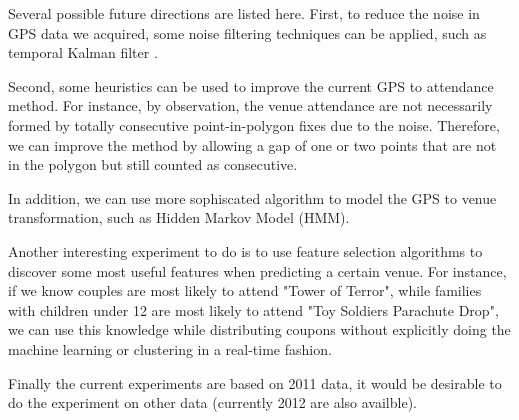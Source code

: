 \documentclass[12pt]{article}
\begin{document}
Several possible future directions are listed here. First, to reduce the noise in GPS data we acquired, some noise filtering techniques can be applied, such as temporal Kalman filter \cite{Welch95}.

Second, some heuristics can be used to improve the current GPS to attendance method. For instance, by observation, the venue attendance are not necessarily formed by totally consecutive point-in-polygon fixes due to the noise. Therefore, we can improve the method by allowing a gap of one or two points that are not in the polygon but still counted as consecutive.

In addition, we can use more sophiscated algorithm to model the GPS to venue transformation, such as Hidden Markov Model (HMM).

Another interesting experiment to do is to use feature selection algorithms to discover some most useful features when predicting a certain venue. For instance, if we know couples are most likely to attend "Tower of Terror", while families with children under 12 are most likely to attend "Toy Soldiers Parachute Drop", we can use this knowledge while distributing coupons without explicitly doing the machine learning or clustering in a real-time fashion.

Finally the current experiments are based on 2011 data, it would be desirable to do the experiment on other data (currently 2012 are also availble). 



\end{document}
